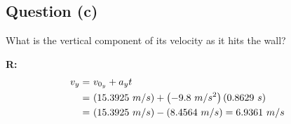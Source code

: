 	\subsection{Question (c)}
		What is the vertical component of its velocity as it hits the wall?

		\textbf{R:} \newline
		\begin{align}
			v_{y} = \ &v_{0_{y}} + a_{y}t& \notag \\
			= \ &(15.3925 \ m/s) + \left( -9.8 \ m/s^{2} \right)(0.8629 \ s)& \notag \\
			= \ &(15.3925 \ m/s) - (8.4564 \ m/s) = 6.9361 \ m/s&
		\end{align}
